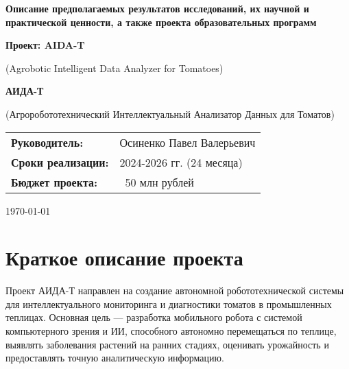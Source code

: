 \documentclass[12pt,a4paper]{article}
\begin{document}
\begin{titlepage}
    \centering
    \vspace*{2cm}
    
    {\Huge\bfseries Описание предполагаемых результатов исследований, их научной и практической ценности, а также проекта образовательных программ\par}
    
    \vspace{2cm}
    
    {\Large\bfseries Проект: AIDA-T\par}
    {\large (Agrobotic Intelligent Data Analyzer for Tomatoes)\par}
    
    \vspace{1cm}
    
    {\large\bfseries АИДА-Т\par}
    {\large (Агроробототехнический Интеллектуальный Анализатор Данных для Томатов)\par}
    
    \vspace{2cm}
    
    \begin{tabular}{ll}
        \textbf{Руководитель:} & Осиненко Павел Валерьевич \\
        \textbf{Сроки реализации:} & 2024-2026 гг. (24 месяца) \\
        \textbf{Бюджет проекта:} & ~50 млн рублей
    \end{tabular}
    
    \vfill
    
    {\large \today\par}
\end{titlepage}

\tableofcontents
\newpage

\section{Краткое описание проекта}

Проект АИДА-Т направлен на создание автономной робототехнической системы для интеллектуального мониторинга и диагностики томатов в промышленных теплицах. Основная цель — разработка мобильного робота с системой компьютерного зрения и ИИ, способного автономно перемещаться по теплице, выявлять заболевания растений на ранних стадиях, оценивать урожайность и предоставлять точную аналитическую информацию.
\end{document}
